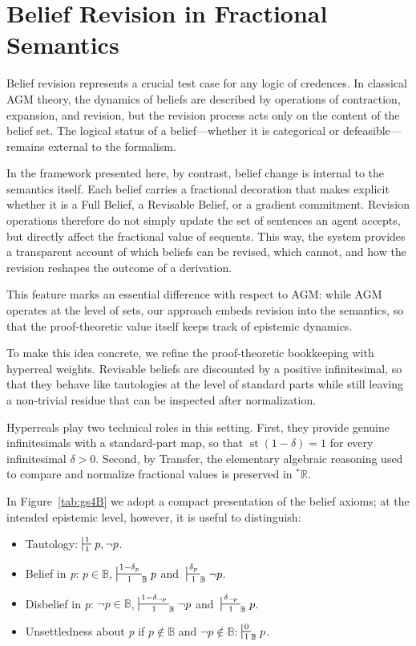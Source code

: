 \documentclass[12pt,a4paper,reqno]{amsart}
\theoremstyle{definition}
\newcommand{\numberset}{\mathbb}
\newcommand{\R}{\numberset{R}}
\newcommand{\B}{\numberset{B}}
\DeclareMathOperator{\st}{st}
\newcommand{\Rstar}{{}^{\ast}\R}
\begin{document}
\section{Belief Revision in Fractional Semantics}
\label{sec:revision}

Belief revision represents a crucial test case for any logic of credences. In classical AGM theory, the dynamics of beliefs are described by operations of contraction, expansion, and revision, but the revision process acts only on the content of the belief set. The logical status of a belief---whether it is categorical or defeasible---remains external to the formalism. 

In the framework presented here, by contrast, belief change is internal to the semantics itself. Each belief carries a fractional decoration that makes explicit whether it is a Full Belief, a Revisable Belief, or a gradient
commitment. Revision operations therefore do not simply update the set of sentences an agent accepts, but directly affect the fractional value of sequents. This way, the system provides a transparent account of which beliefs can be revised, which cannot, and how the revision reshapes the outcome of a derivation. 

This feature marks an essential difference with respect to AGM: while AGM operates at the level of sets, our approach embeds revision into the semantics, so that the proof-theoretic value itself keeps track of epistemic dynamics. 

To make this idea concrete, we refine the proof-theoretic bookkeeping with hyperreal weights.  Revisable beliefs are discounted by a positive infinitesimal, so that they behave like tautologies at the level of standard parts while still leaving a non-trivial residue that can be inspected after normalization.

Hyperreals play two technical roles in this setting.  First, they provide genuine infinitesimals with a standard-part map, so that $\st(1-\delta)=1$ for every infinitesimal $\delta>0$.  Second, by Transfer, the elementary algebraic reasoning used to compare and normalize fractional values is preserved in $\Rstar$.

In Figure~\ref{tab:gs4B} we adopt a compact presentation of the belief axioms; at the intended epistemic level, however, it is useful to distinguish:

\begin{itemize}
 \item Tautology: $\sststile{1}{1} p,\neg p$.
 \item Belief in \textit{p}: $p\in \B$, $\sststile{1}{1-\delta_p}_\B p$ and $\; \sststile{1}{\delta_{p}}_\B \neg p $.
 \item Disbelief in \textit{p}: $\neg p\in \B$, $\sststile{1}{1-\delta_{\neg p}}_\B \neg p$ and $\; \sststile{1}{\delta_{\neg p}}_\B p$.
 \item Unsettledness about \textit{p} if $p\not\in \B$ and $\neg p\not \in \B$: $\sststile{1}{0}_\B p$.
\end{itemize}
\end{document}
